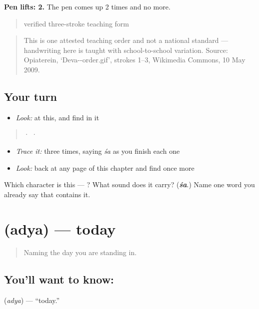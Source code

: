 \textbf{Pen lifts: 2.} The pen comes up 2 times and no more.

\begin{quote}
verified three-stroke teaching form
\end{quote}

\begin{quote}
This is one attested teaching order and not a national standard — handwriting here is taught with school-to-school variation. Source: Opiaterein, ‘Deva--order.gif’, strokes 1–3, Wikimedia Commons, 10 May 2009.
\end{quote}

\subsection*{Your turn}
\begin{itemize}
\raggedright
  \item \emph{Look:} at this, and find  in it
\end{itemize}

\begin{quote}
  ·    ·  
\end{quote}

\begin{itemize}
\raggedright
  \item \emph{Trace it:}  three times, saying \emph{śa} as you finish each one
  \item \emph{Look:} back at any page of this chapter and find  once more
\end{itemize}

\begin{tcolorbox}[breakable,colback=teal!4,colframe=teal!35!black,title={Before you move on}]
Which character is this — ? What sound does it carry? (\emph{\textbf{śa}}.) Name one word you already say that contains it.
\end{tcolorbox}
\section[\texorpdfstring{\sk{अद्य} (adya)}{अद्य (adya)}]{ (adya) — today}

\label{lesson:SA-C17-today}



\begin{quote}
Naming the day you are standing in.
\end{quote}

\subsection*{You'll want to know: }
\textbf{} (\emph{adya}) — \textquotedblleft{}today.\textquotedblright{}

